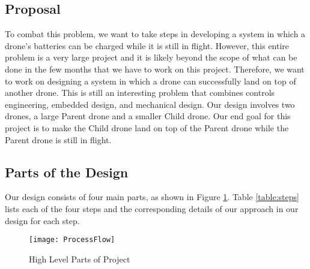 \documentclass[paper=a4, fontsize=12pt]{scrartcl}
\begin{document}
\subsection{Proposal}
To combat this problem, we want to take steps in developing a system in which a drone's batteries can be charged while it is still in flight.
However, this entire problem is a very large project and it is likely beyond the scope of what can be done in the few months that we have to work on this project.
Therefore, we want to work on designing a system in which a drone can successfully land on top of another drone.
This is still an interesting problem that combines controls engineering, embedded design, and mechanical design. 
Our design involves two drones, a large Parent drone and a smaller Child drone.
Our end goal for this project is to make the Child drone land on top of the Parent drone while the Parent drone is still in flight. 

\subsection{Parts of the Design}
Our design consists of four main parts, as shown in Figure \ref{fig:process}. Table \ref{table:steps} lists each of the four steps and the corresponding details of our approach in our design for each step.

\begin{figure}
	\centering
	\texttt{[image: ProcessFlow]}
	\caption{High Level Parts of Project}
	\label{fig:process}
\end{figure}
\end{document}
